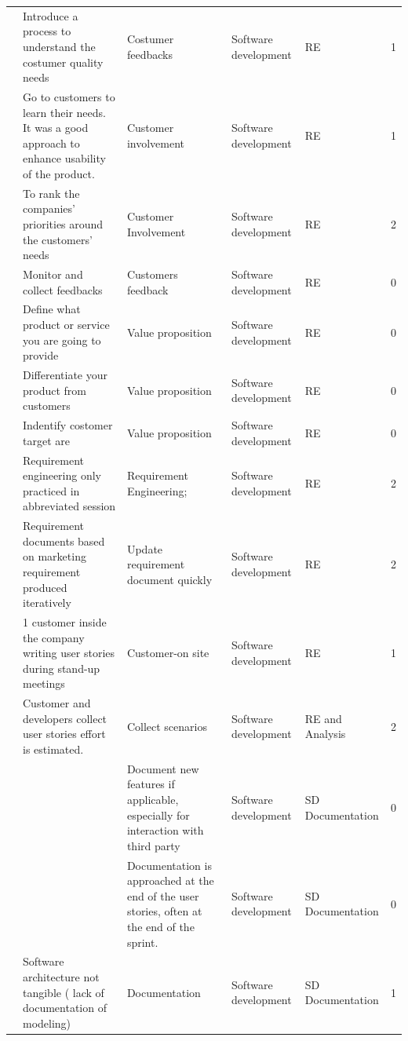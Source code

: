 \documentclass[final,5p,times,twocolumn]{elsarticle}
\begin{document}
\begin{center}
\begin{longtable}{|p{0.36in}|p{2.6in}|p{1.2in}|p{0.9in}|p{0.9in}|p{0.2in}|}
\cite{Mater2000} & Introduce a process to understand the costumer quality needs & Costumer feedbacks & Software development & RE    & 1 \\
\cite{Mirel2000} & Go to customers to learn their needs. It was a good approach to enhance usability of the product. & Customer involvement & Software development & RE    & 1 \\
\cite{Wall2001} & To rank the companies' priorities around the customers' needs & Customer Involvement & Software development & RE    & 2 \\
\cite{Su-Chan2007} & Monitor and collect feedbacks & Customers feedback & Software development & RE    & 0 \\
\cite{Su-Chan2007} & Define what product or service you are going to provide & Value proposition & Software development & RE    & 0 \\
\cite{Su-Chan2007} & Differentiate your product from customers & Value proposition & Software development & RE    & 0 \\
\cite{Su-Chan2007} & Indentify costomer target are & Value proposition & Software development & RE    & 0 \\
\cite{Zettel2001} & Requirement engineering only practiced in abbreviated session & Requirement Engineering; & Software development & RE    & 2 \\
\cite{Ambler2002} & Requirement documents based on marketing requirement produced iteratively & Update requirement document quickly & Software development & RE    & 2 \\
\cite{Silva2005} & 1 customer inside the company writing user stories during stand-up meetings & Customer-on site & Software development & RE    & 1 \\
\cite{Zettel2001} & Customer and developers collect user stories effort is estimated.  & Collect scenarios & Software development & RE and Analysis & 2 \\
\cite{Taipale2010} &       & Document new features if applicable, especially for interaction with third party & Software development & SD Documentation & 0 \\
\cite{Kuvinka2011} &       & Documentation is approached at the end of the user stories, often at the end of the sprint. & Software development & SD Documentation & 0 \\
\cite{Camel1994a} & Software architecture not tangible ( lack of documentation of modeling) & Documentation & Software development & SD Documentation & 1 \\

\end{longtable}
\end{center}
\end{document}
